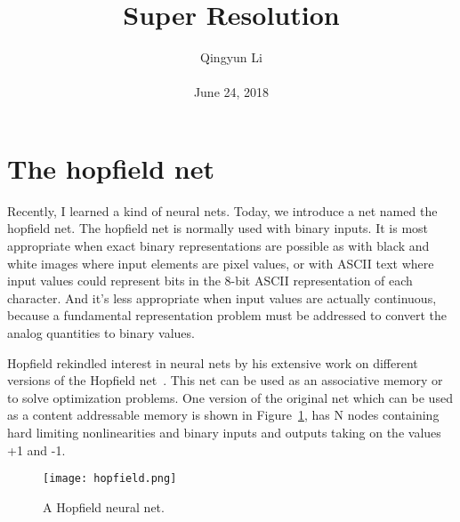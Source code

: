 \documentclass[10pt,twocolumn,letterpaper]{article}
\begin{document}
\author{Qingyun Li\\\\
June 24, 2018}        
\title{Super Resolution}

\maketitle

\section{The hopfield net}
\par Recently, I learned a kind of neural nets. Today, we introduce a net named the hopfield net. The hopfield net is normally used with binary inputs. It is most appropriate when exact binary representations are possible as with black and white images where input elements are pixel values, or with ASCII text where input values could represent bits in the 8-bit ASCII representation of each character. And it's less appropriate when input values are actually continuous, because a fundamental representation problem must be addressed to convert the analog quantities to binary values. 
\par Hopfield rekindled interest in neural nets by his extensive work on different versions of the Hopfield net~\cite{hopfield1986computing}. This net can be used as an associative memory or to solve optimization problems. One version of the original net which can be used as a content addressable memory is shown in Figure~\ref{hop}, has N nodes containing hard limiting nonlinearities and binary inputs and outputs taking on the values +1 and -1.
\begin{figure}[htbp]
 \centering{}
\texttt{[image: hopfield.png]}\\
 \caption{A Hopfield neural net.}
\label{hop}
\end{figure}
 
 
\end{document}
